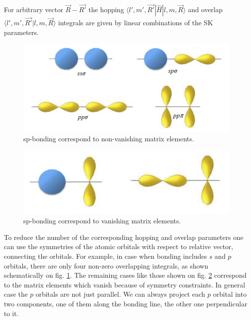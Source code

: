 For arbitrary vector $\vec{R} - \vec{R'} $ the hopping $\langle l', m', \vec{R'} | \hat{H} | l,m,\vec{R} \rangle$ and overlap $\langle l', m', \vec{R'} | l,m,\vec{R} \rangle$ integrals are given by linear combinations of the SK parameters. 

\begin{figure}[h]
  \includegraphics[width=\linewidth]{img/sp_bonding}
  \caption[caption]{sp-bonding correspond to non-vanishing matrix elements. \footnotemark\label{fig:sp} }
\end{figure}
\begin{figure}[h]  
  \includegraphics[width=\linewidth]{img/sp_vanishing}
  \caption[caption]{sp-bonding correspond to vanishing matrix elements.\footnotemark \label{fig:sp_vanishing}}
\end{figure}

To reduce the number of the corresponding hopping and overlap parameters one can use the symmetries of the atomic orbitals with respect to relative vector, connecting the orbitals. For example, in case when bonding includes $s$ and $p$ orbitals, there are only four non-zero overlapping integrals, as shown schematically on fig. \ref{fig:sp}. The remaining cases like those shown on fig. \ref{fig:sp_vanishing} correspond to the matrix elements which vanish because of symmetry constraints. In general case the $p$ orbitals are not just parallel. We can always project each $p$ orbital into two components, one of them along the bonding line, the other one perpendicular to it. 


